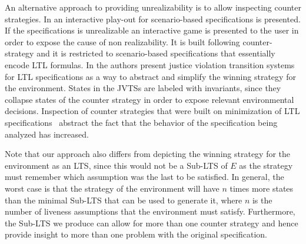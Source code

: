 An alternative approach to providing unrealizability is to allow inspecting counter strategies. 
 In \cite{DBLP:conf/emsoft/CernyGHRT12} an interactive play-out for scenario-based specifications is presented.  If the specifications is unrealizable an interactive game is presented to the user in order to expose the cause of non realizability.  It is built following \cite{DBLP:conf/hvc/KonighoferHB10} counter-strategy and it is restricted to scenario-based specifications that essentially encode LTL formulas.
 In \cite{DBLP:conf/sigsoft/KuventMR17} the authors present
 justice violation transition systems for LTL specifications as a way to abstract
 and simplify the winning strategy for the environment.
 States in the JVTSs are labeled with invariants, since
 they  collapse states of the counter strategy
 in order to expose relevant environmental decisions.
Inspection of counter strategies that were built on minimization of LTL specifications~\cite{DBLP:conf/emsoft/CernyGHRT12,DBLP:conf/sigsoft/KuventMR17} abstract the fact that the behavior of the specification being analyzed has increased. 

 Note that our approach also differs from depicting the winning strategy for the environment as an LTS, since this would not be a Sub-LTS of $E$ as the strategy must remember which assumption was the last to be satisfied. In general, the worst case is that the strategy of the environment will have $n$ times more states than the minimal Sub-LTS that can be used to generate it, where $n$ is the number of liveness assumptions that the environment must satisfy. Furthermore, the Sub-LTS we produce can allow for more than one counter strategy and hence provide insight to more than one problem with the original specification. 
 



